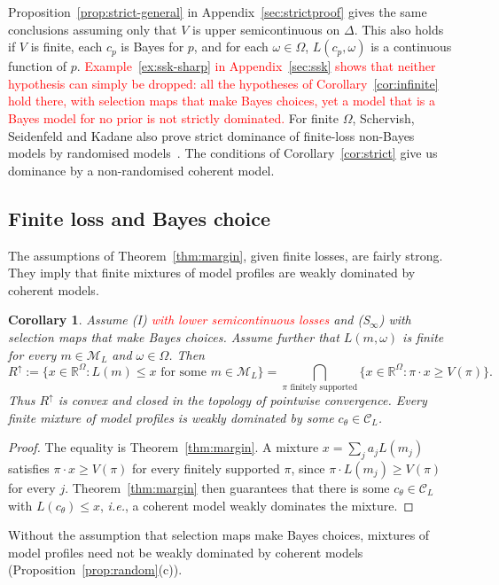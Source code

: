 \documentclass[11pt]{article}
\newtheorem{corollary}[theorem]{Corollary}
\theoremstyle{definition}
\theoremstyle{remark}
\newcommand{\R}{\mathbb R}
\newcommand{\M}{\mathcal M}
\newcommand{\C}{\mathcal C}
\begin{document}
Proposition~\ref{prop:strict-general} in Appendix~\ref{sec:strictproof} gives the same conclusions assuming only that $V$ is upper semicontinuous on $\Delta$. This also holds if $V$ is finite, each $c_p$ is Bayes for $p$, and for each $\omega\in\Omega$, $L(c_p,\omega)$ is a continuous function of $p$. \textcolor{red}{Example~\ref{ex:ssk-sharp} in Appendix~\ref{sec:ssk} shows that neither hypothesis can simply be dropped: all the hypotheses of Corollary~\ref{cor:infinite} hold there, with selection maps that make Bayes choices, yet a model that is a Bayes model for no prior is not strictly dominated.}
For finite $\Omega$, Schervish, Seidenfeld and Kadane also prove strict dominance of finite-loss non-Bayes models by randomised models~\cite[Theorem~7]{SSK09}. The conditions of Corollary~\ref{cor:strict} give us dominance by a non-randomised coherent model. 



\subsection{Finite loss and Bayes choice}\label{sec:convexconsequence}
The assumptions of Theorem~\ref{thm:margin}, given finite losses, are fairly strong. They imply that finite mixtures of model profiles are weakly dominated by coherent models.


\begin{corollary}\label{cor:upperconvex}
Assume (I) \textcolor{red}{with lower semicontinuous losses} and (S$_\infty$) with selection maps that make Bayes choices. Assume further that $L(m,\omega)$ is finite for every $m\in\M_L$ and $\omega\in\Omega$. Then
\[
 R^\uparrow:=\{x\in\R^\Omega:L(m)\le x\text{ for some }m\in\M_L\}
 =\bigcap_{\pi\text{ finitely supported}}
 \{x\in\R^\Omega:\pi\cdot x\ge V(\pi)\}.
\]
Thus $R^\uparrow$ is convex and closed in the topology of pointwise convergence. Every finite mixture of model profiles is weakly dominated by some $c_\theta\in\C_L$.
\end{corollary}
\begin{proof}
The equality is Theorem~\ref{thm:margin}. A mixture $x=\sum_j a_jL(m_j)$ satisfies $\pi\cdot x\ge V(\pi)$ for every finitely supported $\pi$, since $\pi\cdot L(m_j)\ge V(\pi)$ for every $j$. Theorem~\ref{thm:margin} then guarantees that there is some $c_\theta\in\C_L$ with $L(c_\theta)\le x$, \textit{i.e.}, a coherent model weakly dominates the mixture.
\end{proof}
Without the assumption that selection maps make Bayes choices, mixtures of model profiles need not be weakly dominated by coherent models (Proposition~\ref{prop:random}(c)).
\end{document}
